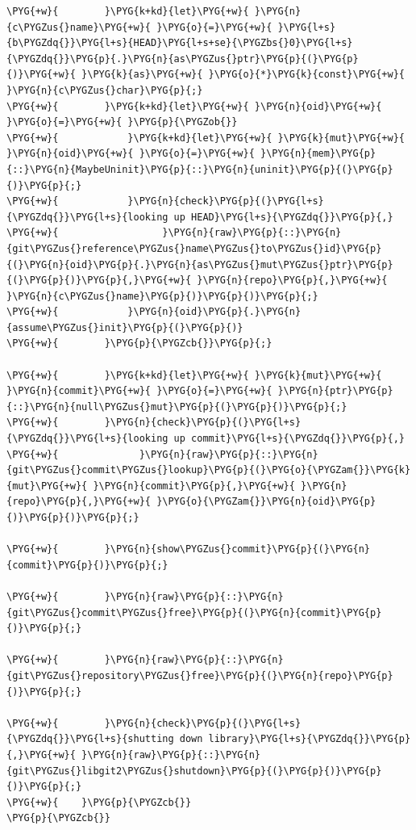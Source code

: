 \begin{Verbatim}[commandchars=\\\{\},breaklines=true,breakanywhere=true,fontsize=\codefont,xleftmargin=17bp]
\PYG{+w}{        }\PYG{k+kd}{let}\PYG{+w}{ }\PYG{n}{c\PYGZus{}name}\PYG{+w}{ }\PYG{o}{=}\PYG{+w}{ }\PYG{l+s}{b\PYGZdq{}}\PYG{l+s}{HEAD}\PYG{l+s+se}{\PYGZbs{}0}\PYG{l+s}{\PYGZdq{}}\PYG{p}{.}\PYG{n}{as\PYGZus{}ptr}\PYG{p}{(}\PYG{p}{)}\PYG{+w}{ }\PYG{k}{as}\PYG{+w}{ }\PYG{o}{*}\PYG{k}{const}\PYG{+w}{ }\PYG{n}{c\PYGZus{}char}\PYG{p}{;}
\PYG{+w}{        }\PYG{k+kd}{let}\PYG{+w}{ }\PYG{n}{oid}\PYG{+w}{ }\PYG{o}{=}\PYG{+w}{ }\PYG{p}{\PYGZob{}}
\PYG{+w}{            }\PYG{k+kd}{let}\PYG{+w}{ }\PYG{k}{mut}\PYG{+w}{ }\PYG{n}{oid}\PYG{+w}{ }\PYG{o}{=}\PYG{+w}{ }\PYG{n}{mem}\PYG{p}{::}\PYG{n}{MaybeUninit}\PYG{p}{::}\PYG{n}{uninit}\PYG{p}{(}\PYG{p}{)}\PYG{p}{;}
\PYG{+w}{            }\PYG{n}{check}\PYG{p}{(}\PYG{l+s}{\PYGZdq{}}\PYG{l+s}{looking up HEAD}\PYG{l+s}{\PYGZdq{}}\PYG{p}{,}
\PYG{+w}{                  }\PYG{n}{raw}\PYG{p}{::}\PYG{n}{git\PYGZus{}reference\PYGZus{}name\PYGZus{}to\PYGZus{}id}\PYG{p}{(}\PYG{n}{oid}\PYG{p}{.}\PYG{n}{as\PYGZus{}mut\PYGZus{}ptr}\PYG{p}{(}\PYG{p}{)}\PYG{p}{,}\PYG{+w}{ }\PYG{n}{repo}\PYG{p}{,}\PYG{+w}{ }\PYG{n}{c\PYGZus{}name}\PYG{p}{)}\PYG{p}{)}\PYG{p}{;}
\PYG{+w}{            }\PYG{n}{oid}\PYG{p}{.}\PYG{n}{assume\PYGZus{}init}\PYG{p}{(}\PYG{p}{)}
\PYG{+w}{        }\PYG{p}{\PYGZcb{}}\PYG{p}{;}

\PYG{+w}{        }\PYG{k+kd}{let}\PYG{+w}{ }\PYG{k}{mut}\PYG{+w}{ }\PYG{n}{commit}\PYG{+w}{ }\PYG{o}{=}\PYG{+w}{ }\PYG{n}{ptr}\PYG{p}{::}\PYG{n}{null\PYGZus{}mut}\PYG{p}{(}\PYG{p}{)}\PYG{p}{;}
\PYG{+w}{        }\PYG{n}{check}\PYG{p}{(}\PYG{l+s}{\PYGZdq{}}\PYG{l+s}{looking up commit}\PYG{l+s}{\PYGZdq{}}\PYG{p}{,}
\PYG{+w}{              }\PYG{n}{raw}\PYG{p}{::}\PYG{n}{git\PYGZus{}commit\PYGZus{}lookup}\PYG{p}{(}\PYG{o}{\PYGZam{}}\PYG{k}{mut}\PYG{+w}{ }\PYG{n}{commit}\PYG{p}{,}\PYG{+w}{ }\PYG{n}{repo}\PYG{p}{,}\PYG{+w}{ }\PYG{o}{\PYGZam{}}\PYG{n}{oid}\PYG{p}{)}\PYG{p}{)}\PYG{p}{;}

\PYG{+w}{        }\PYG{n}{show\PYGZus{}commit}\PYG{p}{(}\PYG{n}{commit}\PYG{p}{)}\PYG{p}{;}

\PYG{+w}{        }\PYG{n}{raw}\PYG{p}{::}\PYG{n}{git\PYGZus{}commit\PYGZus{}free}\PYG{p}{(}\PYG{n}{commit}\PYG{p}{)}\PYG{p}{;}

\PYG{+w}{        }\PYG{n}{raw}\PYG{p}{::}\PYG{n}{git\PYGZus{}repository\PYGZus{}free}\PYG{p}{(}\PYG{n}{repo}\PYG{p}{)}\PYG{p}{;}

\PYG{+w}{        }\PYG{n}{check}\PYG{p}{(}\PYG{l+s}{\PYGZdq{}}\PYG{l+s}{shutting down library}\PYG{l+s}{\PYGZdq{}}\PYG{p}{,}\PYG{+w}{ }\PYG{n}{raw}\PYG{p}{::}\PYG{n}{git\PYGZus{}libgit2\PYGZus{}shutdown}\PYG{p}{(}\PYG{p}{)}\PYG{p}{)}\PYG{p}{;}
\PYG{+w}{    }\PYG{p}{\PYGZcb{}}
\PYG{p}{\PYGZcb{}}
\end{Verbatim}

